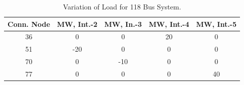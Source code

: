 \documentclass[preprint,12pt,3p]{elsarticle}
\begin{document}
	\begin{table}[ht] 
		
		\caption{Variation of Load for 118 Bus System.} %
		
		\centering %
		
		\begin{tabular}{| c | c | c | c | c |} %
			
			\hline\hline %
			
			Conn. Node & MW, Int.-2 & MW, In.-3 & MW, Int.-4  & MW, Int.-5 \\ [0.5ex] %
			
			
			\hline %
			
			36 &	0 &	0 &	20 &	0 \\ %
			\hline
			51 &	-20 &	0 &	0 &	0 \\ %
			\hline
			70 &	0 &	-10 &	0 &	0 \\ %
			\hline
			77 &	0 &	0 &	0 &	40 \\ %
			\hline
		\end{tabular} 
		
		\label{table:118LASCOPFLoadModified} %
		
	\end{table}
\end{document}
